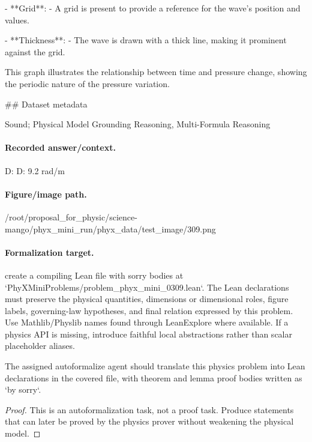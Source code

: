 - **Grid**:
  - A grid is present to provide a reference for the wave’s position and values.

- **Thickness**:
  - The wave is drawn with a thick line, making it prominent against the grid.

This graph illustrates the relationship between time and pressure change, showing the periodic nature of the pressure variation.

\#\# Dataset metadata

Sound; Physical Model Grounding Reasoning, Multi-Formula Reasoning

\paragraph{Recorded answer/context.}
D: D: 9.2 rad/m

\paragraph{Figure/image path.}
/root/proposal\_for\_physic/science-mango/phyx\_mini\_run/phyx\_data/test\_image/309.png

\paragraph{Formalization target.}
create a compiling Lean file with sorry bodies at `PhyXMiniProblems/problem\_phyx\_mini\_0309.lean`. The Lean declarations must preserve the physical quantities, dimensions or dimensional roles, figure labels, governing-law hypotheses, and final relation expressed by this problem.
Use Mathlib/Physlib names found through LeanExplore where available. If a physics API is missing, introduce faithful local abstractions rather than scalar placeholder aliases.

\begin{theorem}
\label{thm:physics:phyx_mini_0309:target}
The assigned autoformalize agent should translate this physics problem into Lean declarations in the covered file, with theorem and lemma proof bodies written as `by sorry`.
\end{theorem}
\begin{proof}
This is an autoformalization task, not a proof task. Produce statements that can later be proved by the physics prover without weakening the physical model.
\end{proof}

